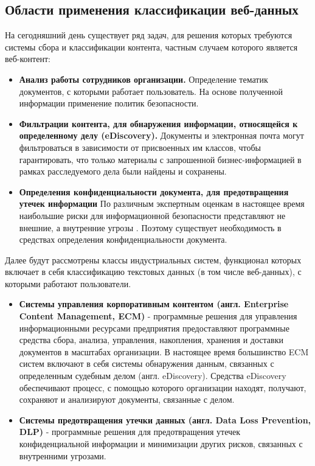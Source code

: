 \documentclass[russian, utf8, emptystyle]{eskdtext}
\begin{document}
\subsection {Области применения классификации веб-данных}
На сегодняшний день существует ряд задач, для решения которых требуются системы сбора и классификации контента, частным случаем которого является веб-контент:
\begin{itemize}
	\item {\bf Анализ работы сотрудников организации.}
	Определение тематик документов, с которыми работает пользователь. На основе полученной информации применение политик безопасности.
	\item {\bf Фильтрации контента, для обнаружения информации, относящейся к определенному делу (eDiscovery\cite{eDiscovery}).}
	Документы и электронная почта могут фильтроваться в зависимости от присвоенных им классов, чтобы гарантировать, что только материалы с запрошенной бизнес-информацией в рамках расследуемого дела были найдены и сохранены.
	\item {\bf Определения конфиденциальности документа, для предотвращения утечек информации}
	По различным экспертным оценкам в настоящее время наибольшие риски для информационной безопасности представляют не внешние, а внутренние угрозы \cite{InfoWatch}.
	Поэтому существует необходимость в средствах определения конфиденциальности документа.
	
\end{itemize}

Далее будут рассмотрены классы индустриальных систем, функционал которых включает в себя классификацию текстовых данных (в том числе веб-данных), с которыми работают пользователи.
\begin{itemize}
	\item {\bf 	Системы управления корпоративным контентом (англ. Enterprise Content Management, ECM) } - программные решения для управления информационными ресурсами предприятия предоставляют программные средства сбора, анализа, управления, накопления, хранения и доставки документов в масштабах организации. В настоящее время большинство ECM систем включают в себя системы обнаружения данным, связанных с определенным судебным делом (англ. eDiscovery). Средства eDiscovery обеспечивают процесс, с помощью которого организации находят, получают, сохраняют и анализируют документы, связанные с делом.
	\item {\bf Системы предотвращения утечки данных (англ. Data Loss Prevention, DLP)} -
	программные решения для предотвращения утечек конфиденциальной информации и минимизации других рисков, связанных с внутренними угрозами.
\end{itemize}
\end{document}
